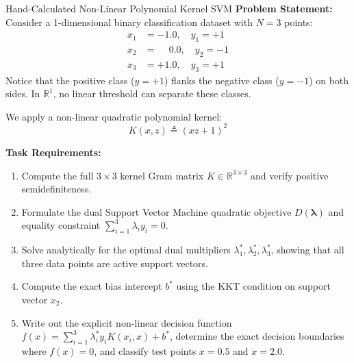 \begin{examplebox}[breakable]{Hand-Calculated Non-Linear Polynomial Kernel SVM}
\textbf{Problem Statement:}
Consider a 1-dimensional binary classification dataset with $N = 3$ points:
\begin{align}
x_1 &= -1.0, \quad y_1 = +1 \\
x_2 &= \phantom{-}0.0, \quad y_2 = -1 \\
x_3 &= +1.0, \quad y_3 = +1
\end{align}
Notice that the positive class ($y = +1$) flanks the negative class ($y = -1$) on both sides. In $\mathbb{R}^1$, no linear threshold can separate these classes.

We apply a non-linear quadratic polynomial kernel:
\begin{equation}
K(x, z) \triangleq (x z + 1)^2
\end{equation}

\textbf{Task Requirements:}
\begin{enumerate}
    \item Compute the full $3 \times 3$ kernel Gram matrix $K \in \mathbb{R}^{3 \times 3}$ and verify positive semidefiniteness.
    \item Formulate the dual Support Vector Machine quadratic objective $D(\boldsymbol{\lambda})$ and equality constraint $\sum_{i=1}^3 \lambda_i y_i = 0$.
    \item Solve analytically for the optimal dual multipliers $\lambda_1^*, \lambda_2^*, \lambda_3^*$, showing that all three data points are active support vectors.
    \item Compute the exact bias intercept $b^*$ using the KKT condition on support vector $x_2$.
    \item Write out the explicit non-linear decision function $f(x) = \sum_{i=1}^3 \lambda_i^* y_i K(x_i, x) + b^*$, determine the exact decision boundaries where $f(x) = 0$, and classify test points $x = 0.5$ and $x = 2.0$.
\end{enumerate}

\tcblower


\end{examplebox}
